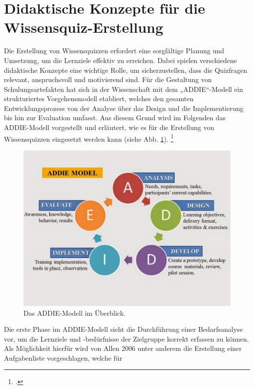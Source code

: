\section{Didaktische Konzepte für die Wissensquiz-Erstellung}
Die Erstellung von Wissensquizzen erfordert eine sorgfältige Planung und Umsetzung, um die Lernziele effektiv zu erreichen.
Dabei spielen verschiedene didaktische Konzepte eine wichtige Rolle, um sicherzustellen, dass die Quizfragen relevant, anspruchsvoll und motivierend sind.
Für die Gestaltung von Schulungsartefakten
hat sich in der Wissenschaft mit dem „\ac{ADDIE}“-Modell ein strukturiertes
Vorgehensmodell etabliert, welches den gesamten Entwicklungsprozess von der Analyse über das Design und die Implementierung bis hin zur Evaluation umfasst.
Aus diesem Grund wird im Folgenden das \ac{ADDIE}-Modell vorgestellt und erläutert, wie es für die Erstellung von Wissensquizzen eingesetzt werden kann (siehe Abb. \ref{fig:mondrian}).
\footcite[Vgl.][1805]{nadiyahDevelopmentOnlineProject2015}
\begin{figure}[H]
    \centering
    \includegraphics[width=1.0\linewidth]{graphics/addie_model.jpg}
    \caption[Das \acs{ADDIE}-Modell im Überblick.]{Das \ac{ADDIE}-Modell im Überblick.\protect\footnotemark}
    \label{fig:mondrian}
\end{figure}
Die erste Phase im \ac{ADDIE}-Modell sieht die Durchführung einer Bedarfsanalyse vor, um die Lernziele und -bedürfnisse der Zielgruppe korrekt erfassen zu können.
Als Möglichkeit hierfür wird von Allen 2006 unter anderem die Erstellung einer Aufgabenliste vorgeschlagen, welche für
